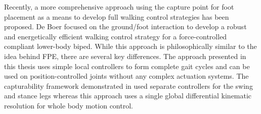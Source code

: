 Recently, a more comprehensive approach using the capture point for foot placement as a means to develop full walking control strategies has been proposed. De Boer \cite{DeBoer:2012wp} focused on the ground/foot interaction to develop a robust and energetically efficient walking control strategy for a force-controlled compliant lower-body biped. While this approach is philosophically similar to the idea behind FPE, there are several key differences. The approach presented in this thesis uses simple local controllers to form complete gait cycles and can be used on position-controlled joints without any complex actuation systems. The capturability framework demonstrated in \cite{Pratt01092012} used separate controllers for the swing and stance legs whereas this approach uses a single global differential kinematic resolution for whole body motion control.

